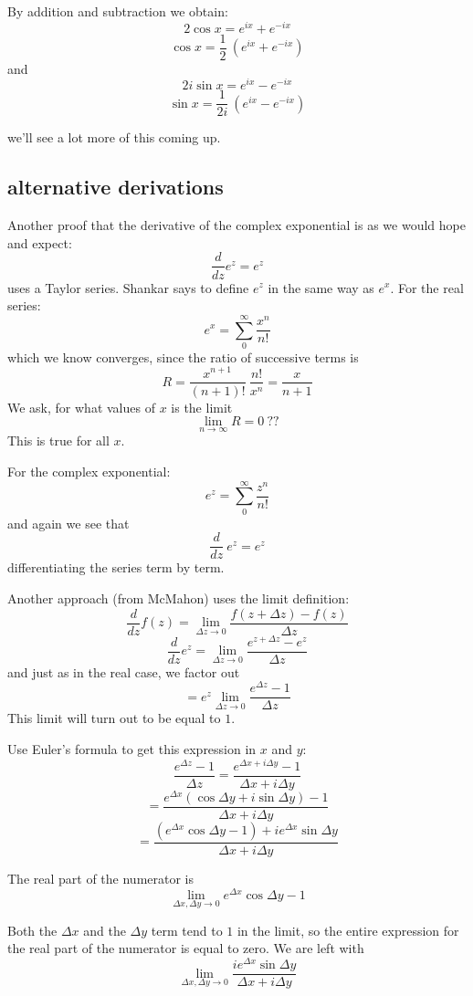 \documentclass[11pt, oneside]{article}
\begin{document}
By addition and subtraction we obtain:
\[ 2 \cos x = e^{i x} + e^{-i x} \]
\[ \cos x = \frac{1}{2} \ (e^{i x} + e^{-i x}) \]
and
\[ 2i \sin x = e^{i x} - e^{-i x} \]
\[ \sin x = \frac{1}{2i} \ (e^{i x} - e^{-i x}) \]

we'll see a lot more of this coming up.

\subsection*{alternative derivations}

Another proof that the derivative of the complex exponential is as we would hope and expect:
\[ \frac{d}{dz} e^z = e^z \]
uses a Taylor series.  Shankar says to define $e^z$ in the same way as $e^x$.  For the real series:
\[ e^x = \sum_0^{\infty} \frac{x^n}{n!} \]
which we know converges, since the ratio of successive terms is
\[ R = \frac{x^{n+1}}{(n+1)!} \ \frac{n!}{x^n} = \frac{x}{n+1} \]
We ask, for what values of $x$ is the limit 
\[ \lim_{n \rightarrow \infty} R = 0 \ ?? \]
This is true for all $x$.

For the complex exponential:
\[ e^z = \sum_0^{\infty} \frac{z^n}{n!} \]
and again we see that 
\[ \frac{d}{dz} \ e^z = e^z \]
differentiating the series term by term.

Another approach (from McMahon) uses the limit definition:
\[ \frac{d}{dz} f(z) = \lim_{\Delta z \rightarrow 0} \frac{f(z + \Delta z) - f(z)}{\Delta z} \]
\[ \frac{d}{dz} e^z =  \lim_{\Delta z \rightarrow 0}  \frac{e^{z + \Delta z} - e^z}{\Delta z} \]
and just as in the real case, we factor out 
\[ =  e^z \lim_{\Delta z \rightarrow 0}  \frac{e^{\Delta z} - 1}{\Delta z} \]
This limit will turn out to be equal to $1$.  

Use Euler's formula to get this expression in $x$ and $y$:
\[ \frac{e^{\Delta z} - 1}{\Delta z} =  \frac{e^{\Delta x + i \Delta y} - 1}{\Delta x + i \Delta y} \]
\[ = \frac{e^{\Delta x} (\cos \Delta y + i \sin \Delta y) - 1}{\Delta x + i \Delta y} \]
\[ = \frac{(e^{\Delta x} \cos \Delta y - 1) + i  e^{\Delta x} \sin \Delta y}{\Delta x + i \Delta y} \]

The real part of the numerator is
\[ \lim_{\Delta x, \Delta y \rightarrow 0} e^{\Delta x} \cos \Delta y - 1 \]

Both the $\Delta x$ and the $\Delta y$ term tend to $1$ in the limit, so the entire expression for the real part of the numerator is equal to zero.  We are left with
\[ \lim_{\Delta x, \Delta y \rightarrow 0}  \frac{i  e^{\Delta x} \sin \Delta y}{\Delta x + i \Delta y} \]
\end{document}
